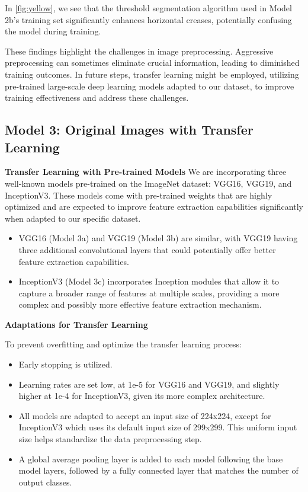 In \autoref{fig:yellow}, we see that the threshold segmentation algorithm used in Model 2b’s training set significantly enhances horizontal creases, potentially confusing the model during training.

These findings highlight the challenges in image preprocessing. Aggressive preprocessing can sometimes eliminate crucial information, leading to diminished training outcomes. In future steps, transfer learning might be employed, utilizing pre-trained large-scale deep learning models adapted to our dataset, to improve training effectiveness and address these challenges.


\subsection{Model 3: Original Images with Transfer Learning}

\textbf{Transfer Learning with Pre-trained Models}
We are incorporating three well-known models pre-trained on the ImageNet dataset: VGG16, VGG19, and InceptionV3. These models come with pre-trained weights that are highly optimized and are expected to improve feature extraction capabilities significantly when adapted to our specific dataset.

\begin{itemize}
    \item VGG16 (Model 3a) and VGG19 (Model 3b) are similar, with VGG19 having three additional convolutional layers that could potentially offer better feature extraction capabilities.
    \item InceptionV3 (Model 3c) incorporates Inception modules that allow it to capture a broader range of features at multiple scales, providing a more complex and possibly more effective feature extraction mechanism.
\end{itemize}

\textbf{Adaptations for Transfer Learning}

To prevent overfitting and optimize the transfer learning process:

\begin{itemize}
    \item Early stopping is utilized.
    \item Learning rates are set low, at 1e-5 for VGG16 and VGG19, and slightly higher at 1e-4 for InceptionV3, given its more complex architecture.
    \item All models are adapted to accept an input size of 224x224, except for InceptionV3 which uses its default input size of 299x299. This uniform input size helps standardize the data preprocessing step.
    \item A global average pooling layer is added to each model following the base model layers, followed by a fully connected layer that matches the number of output classes.
\end{itemize}


